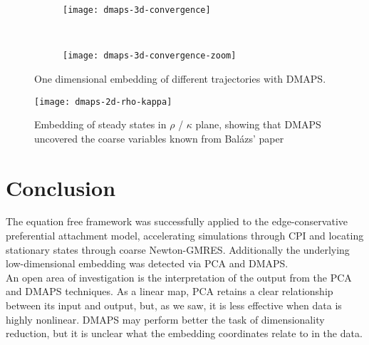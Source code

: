 \documentclass[12pt]{article}
\begin{document}
\begin{onehalfspace}
\begin{figure}[h!]
  \vspace{-5mm}
  \centering
  \begin{subfigure}{0.75\textwidth}
    \centering
    \texttt{[image: dmaps-3d-convergence]}
  \end{subfigure} \\ %
  \begin{subfigure}{0.75\textwidth}
    \centering
    \texttt{[image: dmaps-3d-convergence-zoom]}
  \end{subfigure}%
  \caption{One dimensional embedding of different trajectories with DMAPS. \label{fig:dmaps-results}}
\end{figure}

\begin{figure}[ht!]
  \centering
  \texttt{[image: dmaps-2d-rho-kappa]}
  \caption{Embedding of steady states in $\rho$ / $\kappa$ plane,
    showing that DMAPS uncovered the coarse variables known from
    Bal\'{a}zs' paper \label{fig:dmaps-rk}}
\end{figure}


\section{Conclusion}

The equation free framework was successfully applied to the edge-conservative preferential attachment model, accelerating simulations through CPI and locating stationary states through coarse Newton-GMRES. Additionally the underlying low-dimensional embedding was detected via PCA and DMAPS. \\

An open area of investigation is the interpretation of the output from the PCA and DMAPS techniques. As a linear map, PCA retains a clear relationship between its input and output, but, as we saw, it is less effective when data is highly nonlinear. DMAPS may perform better the task of dimensionality reduction, but it is unclear what the embedding coordinates relate to in the data.



\end{onehalfspace}
\end{document}

